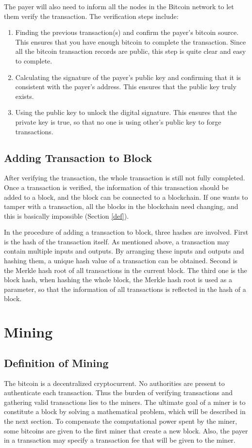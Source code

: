 \documentclass[12pt,a4paper]{article}
\begin{document}
The payer will also need to inform all the nodes in the Bitcoin network to let them verify the transaction. The verification steps include:
\begin{enumerate}
	\item Finding the previous transaction(s) and confirm the payer's bitcoin source. This ensures that you have enough bitcoin to complete the transaction. Since all the bitcoin transaction records are public, this step is quite clear and easy to complete.
 	\item Calculating the signature of the payer's public key and confirming that it is consistent with the payer's address. This ensures that the public key truly exists.
	\item Using the public key to unlock the digital signature. This ensures that the private key is true, so that no one is using other's public key to forge transactions.
\end{enumerate}

\subsection{Adding Transaction to Block} 
After verifying the transaction, the whole transaction is still not fully completed. 
Once a transaction is verified, the information of this transaction should be added to a block, and the block can be connected to a blockchain. If one wants to tamper with a transaction, all the blocks in the blockchain need changing, and this is basically impossible (Section \ref{def}). 

In the procedure of adding a transaction to block, three hashes are involved. First is the hash of the transaction itself. As mentioned above, a transaction may contain multiple inputs and outputs. By arranging these inputs and outputs and hashing them, a unique hash value of a transaction can be obtained. 
Second is the Merkle hash root of all transactions in the current block. 
The third one is the block hash, when hashing the whole block, the Merkle hash root is used as a parameter, so that the information of all transactions is reflected in the hash of a block.

\section{Mining}
\label{sec:mining}
\subsection{Definition of Mining}
The bitcoin is a decentralized cryptocurrent. No authorities are present to authenticate each transaction. Thus the burden of verifying transactions and gathering valid transactions lies to the miners. The ultimate goal of a miner is to constitute a block by solving a mathematical problem, which will be described in the next section. To compensate the computational power spent by the miner, some bitcoins are given to the first miner that create a new block. Also, the payer in a transaction may specify a transaction fee that will be given to the miner. 
\end{document}
